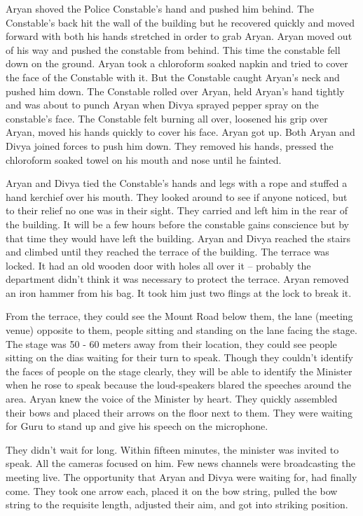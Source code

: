 Aryan shoved the Police Constable's hand and pushed him behind. The Constable's
back hit the wall of the building but he recovered quickly and moved forward
with both his hands stretched in order to grab Aryan. Aryan moved out of his way
and pushed the constable from behind. This time the constable fell down on the
ground. Aryan took a chloroform soaked napkin and tried to cover the face of the
Constable with it. But the Constable caught Aryan's neck and pushed him down.
The Constable rolled over Aryan, held Aryan's hand tightly and was about to
punch Aryan when Divya sprayed pepper spray on the constable's face. The
Constable felt burning all over, loosened his grip over Aryan, moved his hands
quickly to cover his face. Aryan got up. Both Aryan and Divya joined forces to
push him down. They removed his hands, pressed the chloroform soaked towel on
his mouth and nose until he fainted.

Aryan and Divya tied the Constable's hands and legs with a rope and stuffed a
hand kerchief over his mouth. They looked around to see if anyone noticed, but
to their relief no one was in their sight. They carried and left him in the rear
of the building. It will be a few hours before the constable gains conscience
but by that time they would have left the building. Aryan and Divya reached the
stairs and climbed until they reached the terrace of the building. The terrace
was locked. It had an old wooden door with holes all over it – probably the
department didn't think it was necessary to protect the terrace. Aryan removed
an iron hammer from his bag. It took him just two flings at the lock to break
it.

From the terrace, they could see the Mount Road below them, the lane (meeting
venue) opposite to them, people sitting and standing on the lane facing the
stage. The stage was 50 - 60 meters away from their location, they could see
people sitting on the dias waiting for their turn to speak. Though they couldn't
identify the faces of people on the stage clearly, they will be able to identify
the Minister when he rose to speak because the loud-speakers blared the speeches
around the area. Aryan knew the voice of the Minister by heart. They quickly
assembled their bows and placed their arrows on the floor next to them. They
were waiting for Guru to stand up and give his speech on the microphone.

They didn't wait for long. Within fifteen minutes, the minister was invited to
speak. All the cameras focused on him. Few news channels were broadcasting the
meeting live. The opportunity that Aryan and Divya were waiting for, had finally
come. They took one arrow each, placed it on the bow string, pulled the bow
string to the requisite length, adjusted their aim, and got into striking
position.

